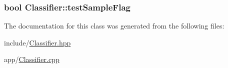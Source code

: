 \subsubsection[{\texorpdfstring{test\+Sample\+Flag}{testSampleFlag}}]{\setlength{\rightskip}{0pt plus 5cm}bool Classifier\+::test\+Sample\+Flag\hspace{0.3cm}{\ttfamily [protected]}}\hypertarget{classClassifier_a18a40094b17a37f0132b935223993630}{}\label{classClassifier_a18a40094b17a37f0132b935223993630}


The documentation for this class was generated from the following files\+:\begin{DoxyCompactItemize}
\item 
include/\hyperlink{Classifier_8hpp}{Classifier.\+hpp}\item 
app/\hyperlink{Classifier_8cpp}{Classifier.\+cpp}\end{DoxyCompactItemize}
